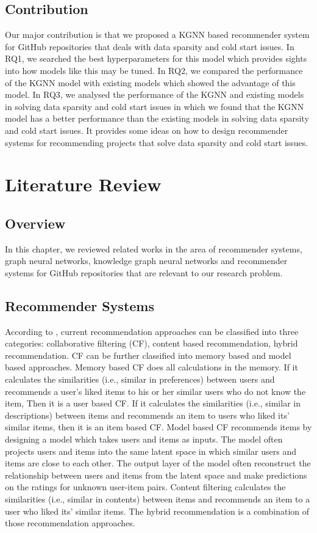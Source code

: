 \documentclass[11pt,twoside]{report}
\begin{document}
\section{Contribution}
Our major contribution is that we proposed a KGNN based recommender system for GitHub repositories that deals with data sparsity and cold start issues. In RQ1, we searched the best hyperparameters for this model which provides sights into how models like this may be tuned. In RQ2, we compared the performance of the KGNN model with existing models which showed the advantage of this model. In RQ3, we analysed the performance of the KGNN and existing models in solving data sparsity and cold start issues in which we found that the KGNN model has a better performance than the existing models in solving data sparsity and cold start issues. It provides some ideas on how to design recommender systems for recommending projects that solve data sparsity and cold start issues.

\chapter{Literature Review}
\section{Overview}
In this chapter, we reviewed related works in the area of recommender systems, graph neural networks, knowledge graph neural networks and recommender systems for GitHub repositories that are relevant to our research problem.

\section{Recommender Systems}
According to \cite{mansur_review_nodate, park_literature_2012}, current recommendation approaches can be classified into three categories: collaborative filtering (CF), content based recommendation, hybrid recommendation. CF can be further classified into memory based and model based approaches. Memory based CF does all calculations in the memory. If it calculates the similarities (i.e., similar in preferences) between users and recommends a user's liked items to his or her similar users who do not know the item, Then it is a user based CF. If it calculates the similarities (i.e., similar in descriptions) between items and recommends an item to users who liked its' similar items, then it is an item based CF. Model based CF recommends items by designing a model which takes users and items as inputs. The model often projects users and items into the same latent space in which similar users and items are close to each other. The output layer of the model often reconstruct the relationship between users and items from the latent space and make predictions on the ratings for unknown user-item pairs. Content filtering calculates the similarities (i.e., similar in contents) between items and recommends an item to a user who liked its' similar items. The hybrid recommendation is a combination of those recommendation approaches.
\end{document}
